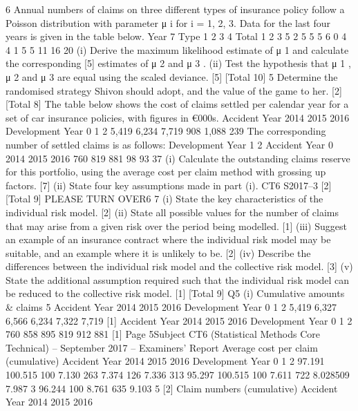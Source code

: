 \documentclass[a4paper,12pt]{article}
\begin{document}
\begin{enumerate}
6
Annual numbers of claims on three different types of insurance policy follow a
Poisson distribution with parameter μ i for i = 1, 2, 3. Data for the last four years is
given in the table below.
Year
7
Type 1 2 3 4 Total
1
2
3 5
2
5 5
5
6 0
4
4 1
5
5 11
16
20
(i) Derive the maximum likelihood estimate of μ 1 and calculate the corresponding
[5]
estimates of μ 2 and μ 3 .
(ii) Test the hypothesis that μ 1 , μ 2 and μ 3 are equal using the scaled deviance. [5]
[Total 10]
5
Determine the randomised strategy Shivon should adopt, and the value of the
game to her.
[2]
[Total 8]
The table below shows the cost of claims settled per calendar year for a set of car
insurance policies, with figures in €000s.
Accident Year
2014
2015
2016
Development Year
0
1
2
5,419
6,234
7,719
908
1,088
239
The corresponding number of settled claims is as follows:
Development Year
1
2
Accident Year 0
2014
2015
2016 760
819
881
98
93
37
(i) Calculate the outstanding claims reserve for this portfolio, using the average
cost per claim method with grossing up factors.
[7]
(ii) State four key assumptions made in part (i).
CT6 S2017–3
[2]
[Total 9]
PLEASE TURN OVER6
7
(i) State the key characteristics of the individual risk model.
[2]
(ii) State all possible values for the number of claims that may arise from a given
risk over the period being modelled.
[1]
(iii) Suggest an example of an insurance contract where the individual risk model
may be suitable, and an example where it is unlikely to be.
[2]
(iv) Describe the differences between the individual risk model and the collective
risk model.
[3]
(v) State the additional assumption required such that the individual risk model
can be reduced to the collective risk model.
[1]
[Total 9]
Q5
(i)
Cumulative amounts & claims
5
Accident Year
2014
2015
2016
Development Year
0
1
2
5,419 6,327 6,566
6,234 7,322
7,719
[1]
Accident Year
2014
2015
2016
Development Year
0
1
2
760
858
895
819
912
881
[1]
Page 5Subject CT6 (Statistical Methods Core Technical) – September 2017 – Examiners’ Report
Average cost per claim (cumulative)
Accident Year
2014
2015
2016
Development Year
0
1
2
97.191%
100.515%
100%
7.130 263
7.374 126
7.336 313
95.297%
100.515%
100%
7.611 722
8.028509
7.987 3
96.244%
100%
8.761 635
9.103 5
[2]
Claim numbers (cumulative)
Accident Year
2014
2015
2016

\end{enumerate}
\end{document}
